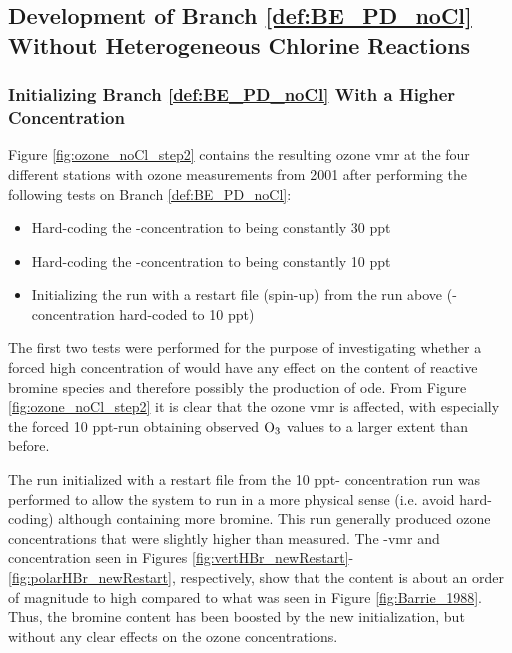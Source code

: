 \subsection{Development of Branch \ref{def:BE_PD_noCl} Without Heterogeneous Chlorine Reactions}


\subsubsection{Initializing Branch \ref{def:BE_PD_noCl} With a Higher  Concentration}\label{sec:disc_step2}

Figure \ref{fig:ozone_noCl_step2} contains the resulting ozone \acrshort{vmr} at the four different stations with ozone measurements from 2001 after performing the following tests on Branch \ref{def:BE_PD_noCl}: 

\begin{itemize}
    \item Hard-coding the -concentration to being constantly 30 ppt 
    \item Hard-coding the -concentration to being constantly 10 ppt
    \item Initializing the run with a restart file (spin-up) from the run above (-concentration hard-coded to 10 ppt)
\end{itemize}

The first two tests were performed for the purpose of investigating whether a forced high concentration of  would have any effect on the content of reactive bromine species and therefore possibly the production of \acrshort{ode}. From Figure \ref{fig:ozone_noCl_step2} it is clear that the ozone \acrshort{vmr} is affected, with especially the forced 10 ppt-run obtaining observed $\mathrm{O_3}$ values to a larger extent than before. 

\medskip

The run initialized with a restart file from the 10 ppt- concentration run was performed to allow the system to run in a more physical sense (i.e. avoid hard-coding) although containing more bromine. This run generally produced ozone concentrations that were slightly higher than measured. The -\acrshort{vmr} and concentration seen in Figures \ref{fig:vertHBr_newRestart}-\ref{fig:polarHBr_newRestart}, respectively, show that the content is about an order of magnitude to high compared to what was seen in Figure \ref{fig:Barrie_1988}. Thus, the bromine content has been boosted by the new initialization, but without any clear effects on the ozone concentrations. 

